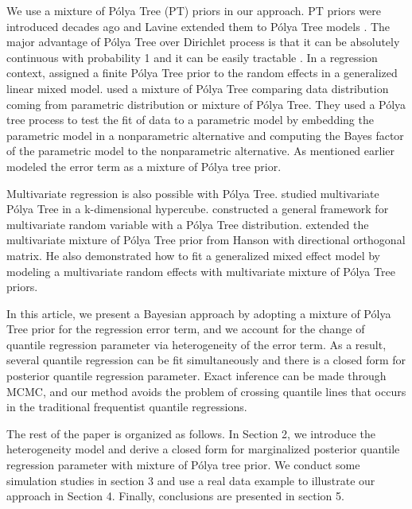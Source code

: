 \documentclass[12pt]{article}
\newcommand{\polya}{P\'{o}lya}
\begin{document}
We use a mixture of \polya{} Tree (PT) priors in our approach. PT
priors were introduced decades ago \citep{freedman1963, fabius1964,
  ferguson1974} and Lavine extended them to \polya{} Tree models
\citep{lavine1992, lavine1994}. The major advantage of \polya{} Tree
over Dirichlet process is that it can be absolutely continuous with
probability 1 and it can be easily tractable . In a regression
context, \citet{walker1997, walker1999} assigned a finite \polya{}
Tree prior to the random effects in a generalized linear mixed
model. \citet{berger2001} used a mixture of \polya{} Tree comparing
data distribution coming from parametric distribution or mixture of
\polya{} Tree. They used a \polya{} tree process to test the fit of
data to a parametric model by embedding the parametric model in a
nonparametric alternative and computing the Bayes factor of the
parametric model to the nonparametric alternative.  As mentioned
earlier \citet{hanson2002} modeled the error term as a mixture of
\polya{} tree prior.

Multivariate regression is also possible with \polya{}
Tree. \citet{paddock1999, paddock2002} studied multivariate \polya{}
Tree in a k-dimensional hypercube. \citet{hanson2006} constructed a
general framework for multivariate random variable with a \polya{}
Tree distribution. \citet{jara2009} extended the multivariate mixture
of \polya{} Tree prior from Hanson with directional orthogonal matrix.
He also demonstrated how to fit a generalized mixed effect model by
modeling a multivariate random effects with multivariate mixture of
\polya{} Tree priors.

In this article, we present a Bayesian approach by adopting a mixture
of \polya{} Tree prior for the regression error term, and we account
for the change of quantile regression parameter via heterogeneity of
the error term. As a result, several quantile regression can be fit
simultaneously and there is a closed form for posterior quantile
regression parameter. Exact inference can be made through MCMC, and
our method avoids the problem of crossing quantile lines that occurs
in the traditional frequentist quantile regressions.

The rest of the paper is organized as follows. In Section 2, we
introduce the heterogeneity model and derive a closed form for
marginalized posterior quantile regression parameter with mixture of
\polya{} tree prior. We conduct some simulation studies in section 3
and use a real data example to illustrate our approach in Section
4. Finally, conclusions are presented in section 5.
\end{document}
